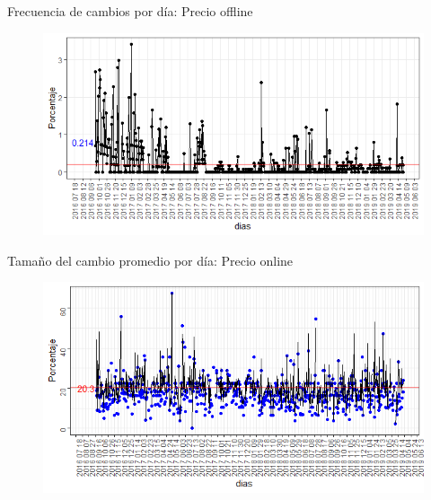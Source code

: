 \documentclass[xcolor=dvipsnames]{beamer}
\begin{document}
\begin{frame}
Frecuencia de cambios por d\'ia: Precio offline
\begin{figure}
\includegraphics[scale=0.65]{frecuencia_dias_normal.png}
\end{figure}
\end{frame}


\begin{frame}
Tamaño del cambio promedio por d\'ia: Precio online
\begin{figure}
\includegraphics[scale=0.60]{tamano_cambio_promedio_internet.png}
\end{figure}
\end{frame}
\end{document}
